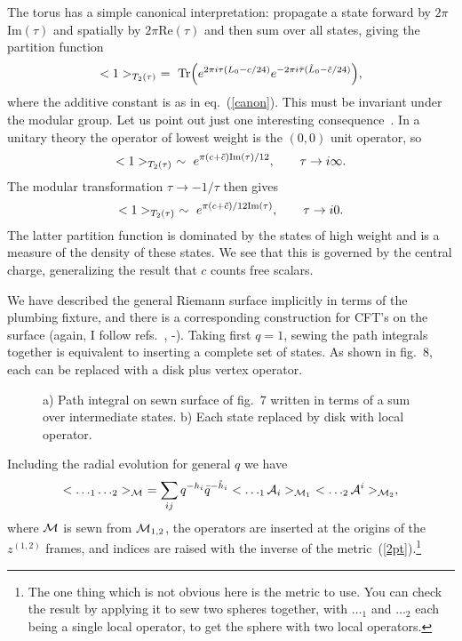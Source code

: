 The torus has a simple canonical interpretation: propagate a state
forward by $2\pi$Im$(\tau)$ and spatially by $2\pi$Re$(\tau)$
and then sum over all states, giving the partition function
\begin{equation}
<1>_{T_2(\tau)}\ =\ {\rm Tr}\Bigl(e^{2\pi i \tau (L_0 - c/24)}
e^{-2\pi i \bar\tau (\tilde L_0 - \tilde c/24)} \Bigr),
\label{partit}
\end{equation}
where the additive constant is as in eq.~(\ref{canon}).  This must be
invariant under the modular group.  Let us point out just one
interesting consequence~\cite{Car1}.  In a unitary theory the
operator of lowest weight is the $(0,0)$ unit operator, so
\begin{equation}
<1>_{T_2(\tau)} 
\ \sim\ e^{\pi ( c + \tilde c){\rm Im}(\tau)/12}, \qquad \tau \to
i\infty.
\end{equation}
The modular transformation $\tau \to -1/\tau$ then gives
\begin{equation}
<1>_{T_2(\tau)} 
\ \sim\ e^{\pi ( c + \tilde c)/12 {\rm Im}(\tau)}, \qquad \tau
\to i0. \label{cdof}
\end{equation}
The latter partition function is dominated by the states of high
weight and is a measure of the density of these states.  We see that
this is governed by the central charge, generalizing the result that
$c$ counts free scalars.

We have described the general Riemann surface implicitly in terms of
the plumbing fixture, and there is a corresponding construction for
CFT's on the surface (again, I follow
refs.~\cite{BPZ}, \cite{V1}-\cite{Son}).
Taking first $q = 1$, sewing the
path integrals together is equivalent to inserting a complete set of
states.  As shown in fig.~8, each can be replaced with a disk
plus vertex operator.
\begin{figure}
\begin{center}
\leavevmode
{}
\end{center}
\caption[]{a) Path integral on sewn surface of fig.~7 written in
terms of a sum over intermediate states. b) Each state replaced by
disk with local operator.}
\end{figure}
Including the radial evolution for general $q$
we have
\begin{equation}
<\ldots_1 \ldots_2 >_{\cal M}\ = \sum_{ij} q^{-h_i} \bar q^{-\tilde
h_i} <\ldots_1 {\cal A}_i>_{{\cal M}_1}\ <\ldots_2 {\cal A}^i>_{{\cal
M}_2},  \label{sew}
\end{equation}
where ${\cal M}$ is sewn from ${\cal M}_{1,2}$, the operators are
inserted at the origins of the $z^{(1,2)}$ frames, and indices are
raised with the inverse of the metric~(\ref{2pt}).\footnote{The one
thing which is not obvious here is the metric to use.  You can check
the result by applying it to sew two spheres together, with
$\ldots_1$ and $\ldots_2$ each being a single local operator, to get
the sphere with two local operators.}

